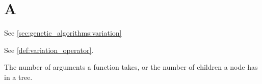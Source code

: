 \section*{A}
  \begin{definition}[Alteration]
  \label{def:alteration}
    See \vref{sec:genetic_algorithms:variation}
  \end{definition}

  \begin{definition}[Alterer]
  \label{def:alterer}
    See \vref{def:variation_operator}.
  \end{definition}

  \begin{definition}[Arity]
  \label{def:arity}
    The number of arguments a function takes, or the number of children a node
    has in a tree.
  \end{definition}